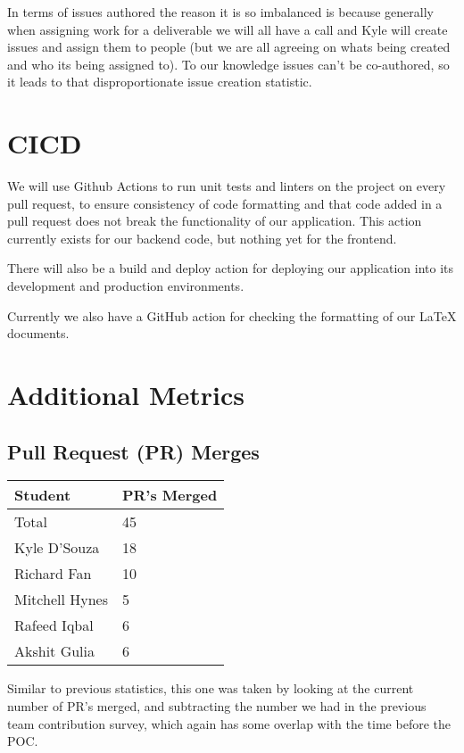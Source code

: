 \documentclass{article}
\begin{document}
In terms of issues authored the reason it is so imbalanced is because
generally when assigning work for a deliverable we will all have a
call and Kyle will create issues and assign them to people (but
  we are all agreeing on whats being created and who its being assigned
to). To our knowledge issues can't be co-authored, so it leads to
that disproportionate issue creation statistic.

\section{CICD}

We will use Github Actions to run unit tests and linters on the
project on every pull request, to ensure consistency of code
formatting and that code added in a pull request does not break the
functionality of our application. This action currently exists for
our backend code, but nothing yet for the frontend.

There will also be a build and deploy action for deploying our application
into its development and production environments.

Currently we also have a GitHub action for checking the formatting of
our LaTeX documents.

\section{Additional Metrics}

\subsection{Pull Request (PR) Merges}

\begin{table}[H]
  \centering
  \begin{tabular}{ll}
    \toprule
    \textbf{Student} & \textbf{PR's Merged}\\
    \midrule
    Total & 45\\
    Kyle D'Souza & 18\\
    Richard Fan & 10\\
    Mitchell Hynes & 5\\
    Rafeed Iqbal & 6\\
    Akshit Gulia & 6\\
    \bottomrule
  \end{tabular}
\end{table}

Similar to previous statistics, this one was taken by looking at the
current number of PR's merged, and subtracting the number we had in
the previous team contribution survey, which again has some overlap
with the time before the POC.
\end{document}
